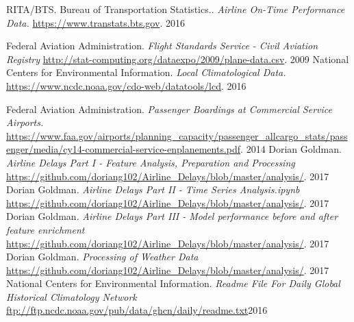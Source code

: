 \documentclass[twocolumn,showpacs,%
  nofootinbib,aps,superscriptaddress,%
  eqsecnum,prd,notitlepage,showkeys,10pt]{revtex4-1}
\begin{document}
  \begin{thebibliography}{1}

   RITA/BTS. Bureau of Transportation Statistics.. {\em Airline On-Time Performance Data.} \url{https://www.transtats.bts.gov}. 2016

    Federal Aviation Administration.  {\em Flight Standards Service - Civil Aviation Registry} \url{http://stat-computing.org/dataexpo/2009/plane-data.csv}. 2009
    National Centers for Environmental Information. {\em Local Climatological Data.} \url{ https://www.ncdc.noaa.gov/cdo-web/datatools/lcd}. 2016

   Federal Aviation Administration. {\em Passenger Boardings at Commercial Service Airports. } \url{https://www.faa.gov/airports/planning_capacity/passenger_allcargo_stats/passenger/media/cy14-commercial-service-enplanements.pdf}. 2014
   Dorian Goldman. {\em Airline Delays Part I - Feature Analysis, Preparation and Processing } \url{https://github.com/doriang102/Airline_Delays/blob/master/analysis/}. 2017
 Dorian Goldman. {\em Airline Delays Part II - Time Series Analysis.ipynb } \url{https://github.com/doriang102/Airline_Delays/blob/master/analysis/}. 2017
 Dorian Goldman. {\em Airline Delays Part III - Model performance before and after feature enrichment } \url{https://github.com/doriang102/Airline_Delays/blob/master/analysis/}. 2017
 Dorian Goldman. {\em Processing of Weather Data} \url{https://github.com/doriang102/Airline_Delays/blob/master/analysis/}. 2017
 National Centers for Environmental Information. {\em Readme File For Daily Global Historical Climatology Network} \url{ftp://ftp.ncdc.noaa.gov/pub/data/ghcn/daily/readme.txt}2016

  \end{thebibliography}
  
\end{document}
